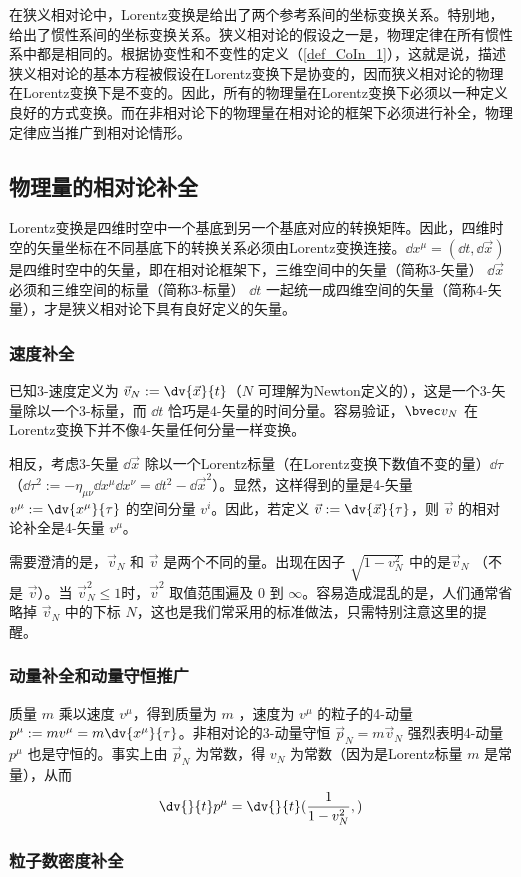 
在狭义相对论中，Lorentz变换是给出了两个参考系间的坐标变换关系。特别地，给出了惯性系间的坐标变换关系。狭义相对论的假设之一是，物理定律在所有惯性系中都是相同的。根据协变性和不变性的定义（\autoref{def_CoIn_1}），这就是说，描述狭义相对论的基本方程被假设在Lorentz变换下是协变的，因而狭义相对论的物理在Lorentz变换下是不变的。因此，所有的物理量在Lorentz变换下必须以一种定义良好的方式变换。而在非相对论下的物理量在相对论的框架下必须进行补全，物理定律应当推广到相对论情形。
\subsection{物理量的相对论补全}
Lorentz变换是四维时空中一个基底到另一个基底对应的转换矩阵。因此，四维时空的矢量坐标在不同基底下的转换关系必须由Lorentz变换连接。$\dd x^\mu=(\dd t,\dd{\vec x})$ 是四维时空中的矢量，即在相对论框架下，三维空间中的矢量（简称3-矢量） $\dd{\vec x}$ 必须和三维空间的标量（简称3-标量） $\dd t$ 一起统一成四维空间的矢量（简称4-矢量），才是狭义相对论下具有良好定义的矢量。

\subsubsection{速度补全}
已知3-速度定义为 $\vec v_N:=\dv{\vec x}{t}$（$N$ 可理解为Newton定义的），这是一个3-矢量除以一个3-标量，而 $\dd t$ 恰巧是4-矢量的时间分量。容易验证，$\bvec v_N$ 在Lorentz变换下并不像4-矢量任何分量一样变换。

相反，考虑3-矢量 $\dd{\vec x}$ 除以一个Lorentz标量（在Lorentz变换下数值不变的量）$\dd\tau$ （$\dd \tau^2:=-\eta_{\mu\nu}\dd x^{\mu}\dd x^\nu=\dd t^2-\dd {\vec x^2}$）。显然，这样得到的量是4-矢量 $v^\mu:=\dv{x^\mu}{\tau}$ 的空间分量 $v^i$。因此，若定义 $\vec v:=\dv{\vec x}{\tau}$，则 $\vec v$ 的相对论补全是4-矢量 $v^\mu$。

需要澄清的是，$\vec v_N$ 和 $\vec v$ 是两个不同的量。出现在因子 $\sqrt{1-v_N^2}$ 中的是$\vec v_N$ （不是 $\vec v$）。当 $\vec v_N^2\leq1$时，$\vec v^2$ 取值范围遍及 $0$ 到 $\infty$。容易造成混乱的是，人们通常省略掉 $\vec v_N$ 中的下标 $N$，这也是我们常采用的标准做法，只需特别注意这里的提醒。

\subsubsection{动量补全和动量守恒推广}
质量 $m$ 乘以速度 $v^\mu$，得到质量为 $m$ ，速度为 $v^\mu$ 的粒子的4-动量 $p^\mu:=mv^\mu=m\dv{x^\mu}{\tau}$。非相对论的3-动量守恒 $\vec p_N=m\vec v_N$ 强烈表明4-动量 $p^\mu$ 也是守恒的。事实上由 $\vec p_N$ 为常数，得 $v_N$ 为常数（因为是Lorentz标量 $m$ 是常量），从而 
\begin{equation}
\dv{}{t}p^\mu=\dv{}{t}(\frac{1}{1-v_N^2},)
\end{equation}


\subsubsection{粒子数密度补全}